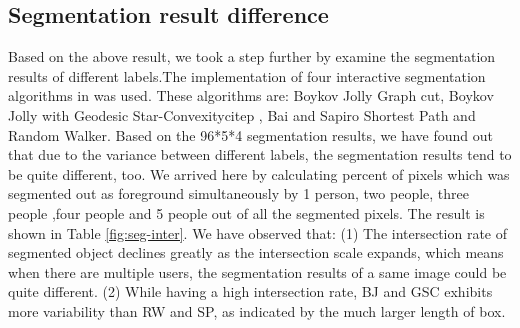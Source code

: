 \documentclass[runningheads,a4paper]{llncs}
\begin{document}
\subsection{Segmentation result difference}
Based on the above result, we took a step further by examine the segmentation results of different labels.The implementation of four interactive segmentation algorithms in \cite{gulshan2010geodesic} was used. These algorithms are: Boykov Jolly Graph cut\cite{boykov2001interactive},  Boykov Jolly with Geodesic Star-Convexitycitep\cite{gulshan2010geodesic} , Bai and Sapiro Shortest Path\cite{bai2007geodesic} and Random Walker\cite{grady2006random}. Based on the 96*5*4 segmentation results, we have found out that due to the variance between different labels, the segmentation results tend to be quite different, too.  We arrived here by calculating percent of pixels which was segmented out as foreground simultaneously by 1 person, two people, three people ,four people and 5 people out of all the segmented pixels. The result is shown in Table \ref{fig:seg-inter}. We have observed that: (1) The intersection rate of segmented object declines greatly as the intersection scale expands, which means when there are multiple users, the segmentation results of a same image could be quite different. (2) While having a high intersection rate, BJ and GSC exhibits more variability than RW and SP, as indicated by the much larger length of box.

\end{document}
